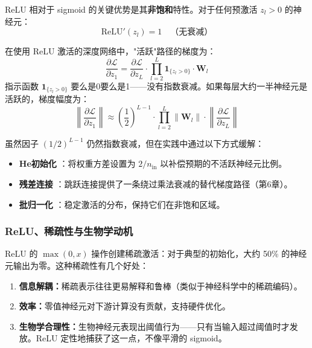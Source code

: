 ReLU 相对于 sigmoid 的关键优势是其\textbf{非饱和}特性。对于任何预激活 $z_l > 0$ 的神经元：
\begin{equation}
\text{ReLU}'(z_l) = 1 \quad \text{（无衰减）}
\end{equation}

在使用 ReLU 激活的深度网络中，"活跃"路径的梯度为：
\begin{equation}
\frac{\partial \mathcal{L}}{\partial z_1} = \frac{\partial \mathcal{L}}{\partial z_L} \cdot \prod_{l=2}^{L} \mathbf{1}_{\{z_l > 0\}} \cdot \mathbf{W}_l
\end{equation}
指示函数 $\mathbf{1}_{\{z_l > 0\}}$ 要么是0要么是1——没有指数衰减。如果每层大约一半神经元是活跃的，梯度幅度为：
\begin{equation}
\left\|\frac{\partial \mathcal{L}}{\partial z_1}\right\| \approx \left(\frac{1}{2}\right)^{L-1} \cdot \prod_{l=2}^{L} \|\mathbf{W}_l\| \cdot \left\|\frac{\partial \mathcal{L}}{\partial z_L}\right\|
\end{equation}

虽然因子 $(1/2)^{L-1}$ 仍然指数衰减，但在实践中通过以下方式缓解：
\begin{itemize}
    \item \textbf{He初始化} \cite{he2015delving}：将权重方差设置为 $2/n_{\text{in}}$ 以补偿预期的不活跃神经元比例。
    \item \textbf{残差连接} \cite{he2016deep}：跳跃连接提供了一条绕过乘法衰减的替代梯度路径（第6章）。
    \item \textbf{批归一化} \cite{ioffe2015batch}：稳定激活的分布，保持它们在非饱和区域。
\end{itemize}

\subsubsection{ReLU、稀疏性与生物学动机}

ReLU 的 $\max(0, x)$ 操作创建稀疏激活：对于典型的初始化，大约 50\% 的神经元输出为零。这种稀疏性有几个好处：
\begin{enumerate}
    \item \textbf{信息解耦：}稀疏表示往往更易解释和鲁棒（类似于神经科学中的稀疏编码）。
    \item \textbf{效率：}零值神经元对下游计算没有贡献，支持硬件优化。
    \item \textbf{生物学合理性：}生物神经元表现出阈值行为——只有当输入超过阈值时才发放。ReLU 定性地捕获了这一点，不像平滑的 sigmoid。
\end{enumerate}

